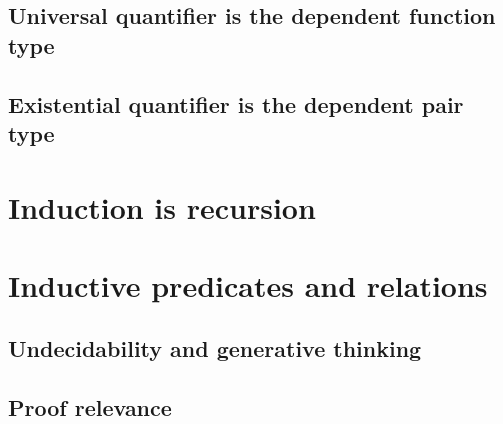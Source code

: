 \documentclass{beamer}
\begin{document}
\subsection{Universal quantifier is the dependent function type}
\subsection{Existential quantifier is the dependent pair type}


\section{Induction is recursion}


\section{Inductive predicates and relations}

\subsection{Undecidability and generative thinking}

\subsection{Proof relevance}
\end{document}
